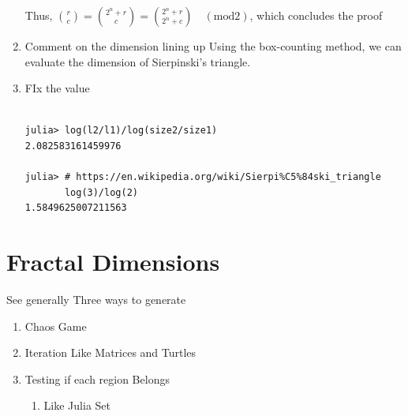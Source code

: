 \documentclass[11pt]{article}
\begin{document}
\begin{enumerate}
Thus, \(\binom{r}{c} = \binom{2^n + r}{c} = \binom{2^n + r}{2^n + c} \quad (\text{mod} 2)\), which concludes the proof

\item Comment on the dimension lining up
\label{sec:org2b0607a}
Using the box-counting method, we can evaluate the dimension of Sierpinski's triangle.
\item FIx the value
\label{sec:orgb8c1634}

\begin{verbatim}

julia> log(l2/l1)/log(size2/size1)
2.082583161459976

julia> # https://en.wikipedia.org/wiki/Sierpi%C5%84ski_triangle
       log(3)/log(2)
1.5849625007211563

\end{verbatim}
\end{enumerate}

\section{Fractal Dimensions}
\label{sec:org8d210a1}
See generally \cite[Ch. 11]{strogatzNonlinearDynamicsChaos2015}
Three ways to generate

\begin{enumerate}
\item Chaos Game
\item Iteration Like Matrices and Turtles
\item Testing if each region Belongs
\begin{enumerate}
\item Like Julia Set
\end{enumerate}
\end{enumerate}
\end{document}
